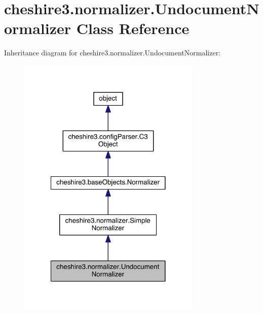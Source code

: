 \hypertarget{classcheshire3_1_1normalizer_1_1_undocument_normalizer}{\section{cheshire3.\-normalizer.\-Undocument\-Normalizer Class Reference}
\label{classcheshire3_1_1normalizer_1_1_undocument_normalizer}
}


Inheritance diagram for cheshire3.\-normalizer.\-Undocument\-Normalizer\-:
\nopagebreak
\begin{figure}[H]
\begin{center}
\leavevmode
\includegraphics[width=248pt]{classcheshire3_1_1normalizer_1_1_undocument_normalizer__inherit__graph}
\end{center}
\end{figure}


